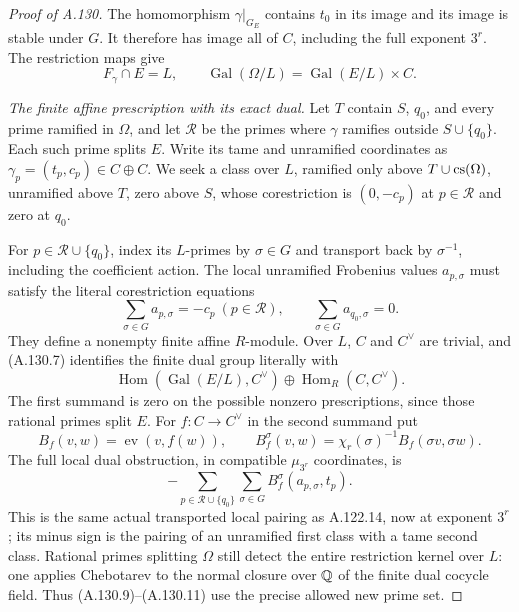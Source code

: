 \begin{proof}[Proof of A.130]
The homomorphism \(\gamma|_{G_E}\) contains \(t_0\)
in its image and its image is stable under \(G\).
It therefore has image all of \(C\), including the
full exponent \(3^r\).  The restriction maps give
\[
             F_\gamma\cap E=L,\qquad
       \operatorname{Gal}(\Omega/L)
                       =\operatorname{Gal}(E/L)\times C.
 \tag{A.130.7}
\]

\emph{The finite affine prescription with its exact dual.}
Let \(T\) contain \(S\), \(q_0\), and every prime
ramified in \(\Omega\), and let \(\mathcal R\) be the
primes where \(\gamma\) ramifies outside
\(S\cup\{q_0\}\).
Each such prime splits \(E\).
Write its tame and unramified coordinates as
\(\gamma_p=(t_p,c_p)\in C\oplus C\).
We seek a class over \(L\), ramified only above
\(T\cup{\rm cs}(\Omega)\), unramified above \(T\),
zero above \(S\), whose corestriction is
\((0,-c_p)\) at \(p\in\mathcal R\) and zero at \(q_0\).

For \(p\in\mathcal R\cup\{q_0\}\), index its
\(L\)-primes by \(\sigma\in G\) and transport back
by \(\sigma^{-1}\), including the coefficient action.
The local unramified Frobenius values \(a_{p,\sigma}\)
must satisfy the literal corestriction equations
\[
 \sum_{\sigma\in G}a_{p,\sigma}=-c_p
       \ (p\in\mathcal R),\qquad
                    \sum_{\sigma\in G}a_{q_0,\sigma}=0.
 \tag{A.130.8}
\]
They define a nonempty finite affine \(R\)-module.
Over \(L\), \(C\) and \(C^\vee\) are trivial, and
(A.130.7) identifies the finite dual group literally with
\[
 \operatorname{Hom}(\operatorname{Gal}(E/L),C^\vee)
                \oplus\operatorname{Hom}_{R}(C,C^\vee).
 \tag{A.130.9}
\]
The first summand is zero on the possible nonzero
prescriptions, since those rational primes split \(E\).
For \(f:C\to C^\vee\) in the second summand put
\[
 B_f(v,w)=\operatorname{ev}(v,f(w)),\qquad
 B_f^\sigma(v,w)=\chi_r(\sigma)^{-1}B_f(\sigma v,\sigma w).
 \tag{A.130.10}
\]
The full local dual obstruction, in compatible
\(\mu_{3^r}\) coordinates, is
\[
       -\sum_{p\in\mathcal R\cup\{q_0\}}
                   \sum_{\sigma\in G}B_f^\sigma(a_{p,\sigma},t_p).
 \tag{A.130.11}
\]
This is the same actual transported local pairing as
A.122.14, now at exponent \(3^r\); its minus sign is
the pairing of an unramified first class with a tame
second class.  Rational primes splitting \(\Omega\)
still detect the entire restriction kernel over \(L\):
one applies Chebotarev to the normal closure over
\(\mathbb Q\) of the finite dual cocycle field.
Thus (A.130.9)--(A.130.11) use the precise allowed
new prime set.


\end{proof}
